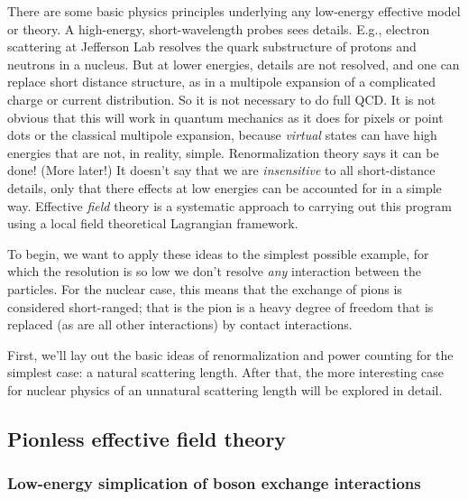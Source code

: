 There are some basic physics principles underlying any low-energy
    effective model or theory.
A high-energy, short-wavelength probes sees details.  E.g.,
  electron scattering at Jefferson Lab resolves the quark substructure
  of protons and neutrons in a nucleus. 
But at lower energies, details are not resolved,
  and one can replace short distance structure, as in
  a multipole expansion of a complicated charge or current distribution.
  So it is not necessary to do full QCD.
It is not obvious that this will work in quantum mechanics as
  it does for pixels or point dots or the classical multipole expansion,
  because \emph{virtual} states can have high energies that are not, in
  reality, simple.  Renormalization theory says it can be done!  (More
  later!)  It doesn't say that we are \emph{insensitive} to all short-distance
  details, only that there effects at low energies
   can be accounted for in a simple way.
Effective \emph{field} theory is a systematic approach to carrying out
  this program using a local field theoretical Lagrangian framework.  

 
%

To begin, we want to apply these ideas to the simplest possible example, for which
the resolution is so low we don't resolve \emph{any} interaction between
the particles.  For the nuclear case, this means that the exchange of pions
is considered short-ranged; that is the pion is a heavy degree of freedom
that is replaced (as are all other interactions) by contact interactions.

First, we'll lay out the basic ideas of renormalization and power
counting for the simplest case: a natural scattering length.  After that, the more interesting case for nuclear physics of an unnatural scattering
length will be explored in detail.


\subsection{Pionless effective field theory}

\subsubsection{Low-energy simplication of boson exchange interactions}



